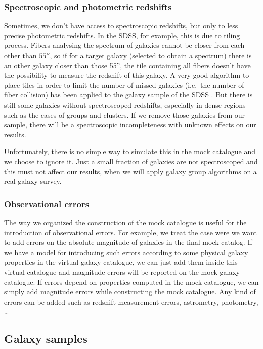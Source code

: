 \subsubsection{Spectroscopic and photometric redshifts}

Sometimes, we don't have access to spectroscopic redshifts, but only to less
precise photometric redshifts. In the SDSS, for example, this is due to tiling
process. Fibers analysing the spectrum of galaxies cannot be closer from each
other than $55''$, so if for a target galaxy (selected to obtain a spectrum)
there is an other galaxy closer than those 55'', the tile containing all fibers
doesn't have the possibility to measure the redshift of this galaxy. A very
good algorithm to place tiles in order to limit the number of missed galaxies
(i.e.\ the number of fiber collision) has been applied to the galaxy sample of
the SDSS \citep{Blanton+03}. But there is still some galaxies without
spectroscoped redshifts, especially in dense regions such as the cases of
groups and clusters. If we remove those galaxies from our sample, there
will be a spectroscopic incompleteness with unknown effects on our results.

Unfortunately, there is no simple way to simulate this in the mock catalogue
and we choose to ignore it. Just a small fraction of galaxies are not
spectroscoped and this must not affect our results, when we will apply galaxy
group algorithms on a real galaxy survey.

\subsubsection{Observational errors}

The way we organized the construction of the mock catalogue is useful for the
introduction of observational errors. For example, we treat the case were we
want to add errors on the absolute magnitude of galaxies in the final mock
catalog. If we have a model for introducing such errors according to some
physical galaxy properties in the virtual galaxy catalogue, we can just add them
inside this virtual catalogue and magnitude errors will be reported on the mock galaxy
catalogue. If errors depend on properties computed in the mock catalogue, we
can simply add magnitude errors while constructing the mock catalogue. Any
kind of errors can be added such as redshift measurement errors, astrometry,
photometry, \dots

\subsection{Galaxy samples}
\label{sub:galaxy_samples}

